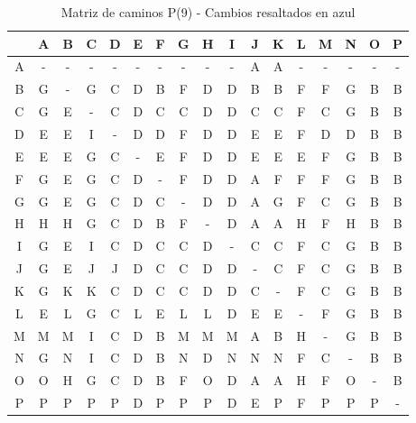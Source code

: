 \documentclass[12pt]{article}
\begin{document}
\begin{table}[h!]
\centering
\begin{tabular}{|c|c|c|c|c|c|c|c|c|c|c|c|c|c|c|c|c|}
\hline
 & A & B & C & D & E & F & G & H & I & J & K & L & M & N & O & P \\\hline
A & - & - & - & - & - & - & - & - & - & A & A & - & - & - & - & - \\\hline
B & G & - & G & C & D & B & F & D & D & B & B & F & F & G & B & B \\\hline
C & G & E & - & C & D & C & C & D & D & C & C & F & C & G & B & B \\\hline
D & E & E & \cellcolor{lightblue} I & - & D & D & F & D & D & E & E & F & D & D & B & B \\\hline
E & E & E & G & C & - & E & F & D & D & E & E & E & F & G & B & B \\\hline
F & G & E & G & C & D & - & F & D & D & A & F & F & F & G & B & B \\\hline
G & G & E & G & C & D & C & - & D & D & A & G & F & C & G & B & B \\\hline
H & H & H & G & C & D & B & F & - & D & A & A & H & F & H & B & B \\\hline
I & G & E & I & C & D & C & C & D & - & C & C & F & C & G & B & B \\\hline
J & G & E & J & J & D & C & C & D & D & - & C & F & C & G & B & B \\\hline
K & G & K & K & C & D & C & C & D & D & C & - & F & C & G & B & B \\\hline
L & E & L & G & C & L & E & L & L & D & E & E & - & F & G & B & B \\\hline
M & M & M & \cellcolor{lightblue} I & C & D & B & M & M & M & A & B & H & - & G & B & B \\\hline
N & G & N & \cellcolor{lightblue} I & \cellcolor{lightblue} C & D & B & N & D & N & N & N & F & \cellcolor{lightblue} C & - & B & B \\\hline
O & O & H & G & C & D & B & F & O & D & A & A & H & F & O & - & B \\\hline
P & P & P & P & P & D & P & P & P & D & E & P & F & P & P & P & - \\\hline
\end{tabular}
\caption{Matriz de caminos P(9) - Cambios resaltados en azul}
\end{table}
\end{document}
